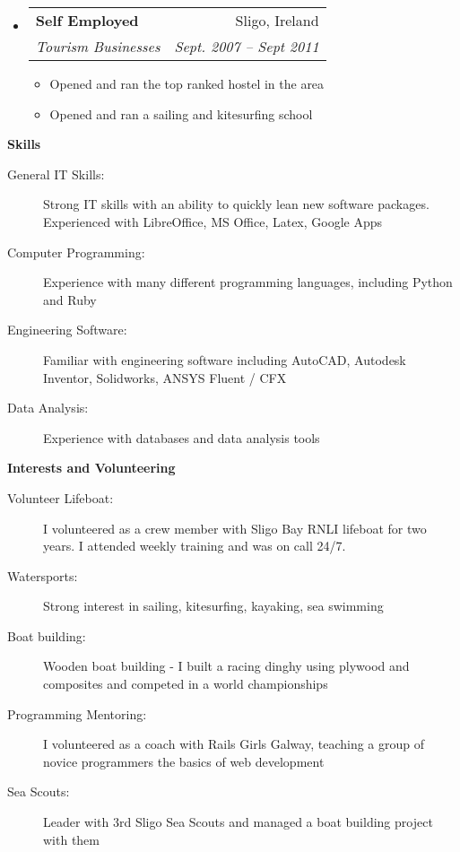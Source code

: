 \documentclass[letterpaper,11pt]{article}
\makeatletter
\newcommand{\resitem}[1]{\item #1 \vspace{-2pt}}
\newcommand{\resheading}[1]{{\large \colorbox{mygrey}{\begin{minipage}{\textwidth}{\textbf{#1 \vphantom{p\^{E}}}}\end{minipage}}}}
\newcommand{\ressubheading}[4]{
\begin{tabular*}{6.5in}{l@{\extracolsep{\fill}}r}
		\textbf{#1} & #2 \\
		\textit{#3} & \textit{#4} \\
\end{tabular*}\vspace{-6pt}}
\makeatother
\begin{document}
\begin{itemize}
		  \item 
      \ressubheading{Self Employed}{Sligo, Ireland}{Tourism Businesses}{Sept. 2007 -- Sept 2011}
        {
        \begin{itemize}
       	 \resitem{Opened and ran the top ranked hostel in the area}
         \resitem{Opened and ran a sailing and kitesurfing school}
        \end{itemize}
        }

	\end{itemize}  %

\resheading{Skills}
	\begin{description}
		\item[General IT Skills:] Strong IT skills with an ability to quickly lean new software packages. Experienced with LibreOffice, MS Office, Latex, Google Apps 
		\item[Computer Programming:] Experience with many different programming languages, including Python and Ruby
    \item[Engineering Software:] Familiar with engineering software including AutoCAD, Autodesk Inventor, Solidworks, ANSYS Fluent / CFX
    \item[Data Analysis:] Experience with databases and data analysis tools
	\end{description} %

\resheading{Interests and Volunteering}
	\begin{description}
		\item[Volunteer Lifeboat:] I volunteered as a crew member with Sligo Bay RNLI lifeboat for two years. I attended weekly training and was on call 24/7.
		\item[Watersports:] Strong interest in sailing, kitesurfing, kayaking, sea swimming
		\item[Boat building:] Wooden boat building - I built a racing dinghy using plywood and composites and competed in a world championships
		\item[Programming Mentoring:] I volunteered as a coach with Rails Girls Galway, teaching a group of novice programmers the basics of web development
		\item[Sea Scouts:] Leader with 3rd Sligo Sea Scouts and managed a boat building project with them

	\end{description} %
\end{document}
